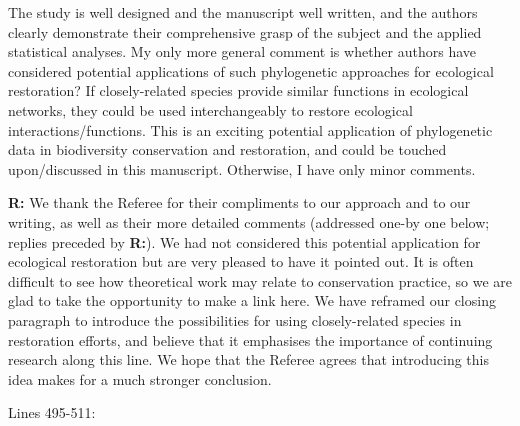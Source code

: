 \documentclass[12pt]{letter}
\newenvironment{refquote}{\bigskip \begin{it}}{\end{it}\smallskip}
\begin{document}
	\begin{refquote}
		The study is well designed and the manuscript well written, and the authors clearly demonstrate their comprehensive grasp of the subject and the applied statistical analyses.
		My only more general comment is whether authors have considered potential applications of such phylogenetic approaches for ecological restoration? If closely-related species provide similar functions in ecological networks, they could be used interchangeably to restore ecological interactions/functions. This is an exciting potential application of phylogenetic data in biodiversity conservation and restoration, and could be touched upon/discussed in this manuscript.
		Otherwise, I have only minor comments.
	\end{refquote}

	\textbf{R:} We thank the Referee for their compliments to our approach and to our writing, as well as their more detailed comments (addressed one-by one below; replies preceded by \textbf{R:}). We had not considered this potential application for ecological restoration but are very pleased to have it pointed out. It is often difficult to see how theoretical work may relate to conservation practice, so we are glad to take the opportunity to make a link here. We have reframed our closing paragraph to introduce the possibilities for using closely-related species in restoration efforts, and believe that it emphasises the importance of continuing research along this line. We hope that the Referee agrees that introducing this idea makes for a much stronger conclusion.


	Lines 495-511:
\end{document}
